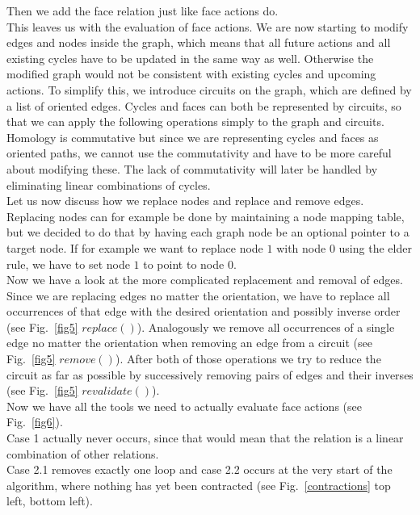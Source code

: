 \documentclass[11pt, a4paper, UKenglish]{article}
\begin{document}
    Then we add the face relation just like face actions do.\\
    This leaves us with the evaluation of face actions.
    We are now starting to modify edges and nodes inside the graph, which means that all future actions and all existing cycles have to be updated in the same way as well.
    Otherwise the modified graph would not be consistent with existing cycles and upcoming actions.
    To simplify this, we introduce circuits on the graph, which are defined by a list of oriented edges.
    Cycles and faces can both be represented by circuits, so that we can apply the following operations simply to the graph and circuits.
    Homology is commutative but since we are representing cycles and faces as oriented paths, we cannot use the commutativity and have to be more careful about modifying these.
    The lack of commutativity will later be handled by eliminating linear combinations of cycles.\\
    Let us now discuss how we replace nodes and replace and remove edges.
    Replacing nodes can for example be done by maintaining a node mapping table, but we decided to do that by having each graph node be an optional pointer to a target node.
    If for example we want to replace node $1$ with node $0$ using the elder rule, we have to set node $1$ to point to node $0$.\\
    Now we have a look at the more complicated replacement and removal of edges.
    Since we are replacing edges no matter the orientation, we have to replace all occurrences of that edge with the desired orientation and possibly inverse order (see Fig.\ \ref{fig5} $replace()$).
    Analogously we remove all occurrences of a single edge no matter the orientation when removing an edge from a circuit (see Fig.\ \ref{fig5} $remove()$).
    After both of those operations we try to reduce the circuit as far as possible by successively removing pairs of edges and their inverses (see Fig.\ \ref{fig5} $revalidate()$).\\
    \newpage
    Now we have all the tools we need to actually evaluate face actions (see Fig.\ \ref{fig6}).\\
    
    Case 1 actually never occurs, since that would mean that the relation is a linear combination of other relations.\\
    Case 2.1 removes exactly one loop and case 2.2 occurs at the very start of the algorithm, where nothing has yet been contracted (see Fig.\ \ref{contractions} top left, bottom left).\\
\end{document}
